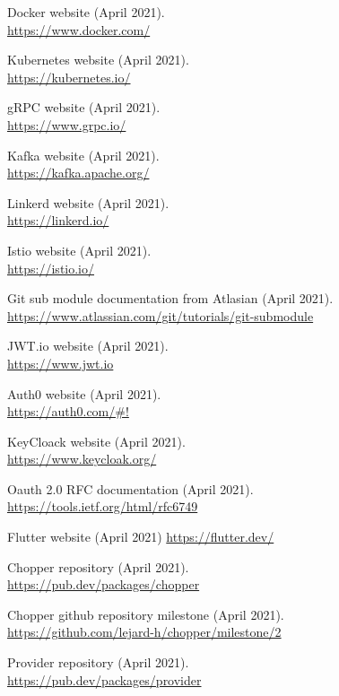 \documentclass{article}
\begin{document}
\begin{multicols}{2}
\newpage
\begin{thebibliography}{9}

  Docker website (April 2021).\\
  \url{https://www.docker.com/}

  Kubernetes website (April 2021).\\
  \url{https://kubernetes.io/}

  gRPC website (April 2021).\\
  \url{https://www.grpc.io/}

  Kafka website (April 2021).\\
  \url{https://kafka.apache.org/}

  Linkerd website (April 2021).\\
  \url{https://linkerd.io/}

  Istio website (April 2021).\\
  \url{https://istio.io/}
  
  Git sub module documentation from Atlasian (April 2021).\\
  \url{https://www.atlassian.com/git/tutorials/git-submodule}
 
  JWT.io website (April 2021).\\
  \url{https://www.jwt.io}

  Auth0 website (April 2021).\\
  \url{https://auth0.com/#!}

  KeyCloack website (April 2021).\\
  \url{https://www.keycloak.org/}

  Oauth 2.0 RFC documentation (April 2021).\\
  \url{https://tools.ietf.org/html/rfc6749}

  Flutter website (April 2021)
  \url{https://flutter.dev/}

  Chopper repository (April 2021).\\
  \url{https://pub.dev/packages/chopper}

  Chopper github repository milestone (April 2021).\\
  \url{https://github.com/lejard-h/chopper/milestone/2}

  Provider repository (April 2021).\\
  \url{https://pub.dev/packages/provider}


\end{thebibliography}
\end{multicols}
\end{document}
